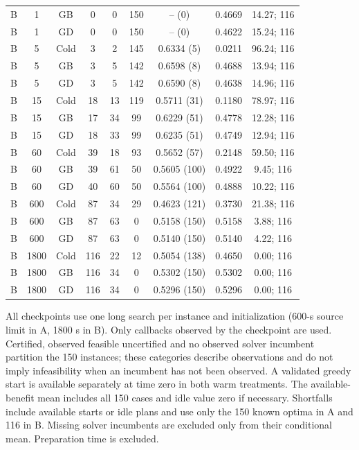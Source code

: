 \begin{table}[!htbp]
\begin{tabular}{@{}ccccccccc@{}}
B & 1 & GB & 0 & 0 & 150 & -- (0) & 0.4669 & 14.27; 116 \\
B & 1 & GD & 0 & 0 & 150 & -- (0) & 0.4622 & 15.24; 116 \\
B & 5 & Cold & 3 & 2 & 145 & 0.6334 (5) & 0.0211 & 96.24; 116 \\
B & 5 & GB & 3 & 5 & 142 & 0.6598 (8) & 0.4688 & 13.94; 116 \\
B & 5 & GD & 3 & 5 & 142 & 0.6590 (8) & 0.4638 & 14.96; 116 \\
B & 15 & Cold & 18 & 13 & 119 & 0.5711 (31) & 0.1180 & 78.97; 116 \\
B & 15 & GB & 17 & 34 & 99 & 0.6229 (51) & 0.4778 & 12.28; 116 \\
B & 15 & GD & 18 & 33 & 99 & 0.6235 (51) & 0.4749 & 12.94; 116 \\
B & 60 & Cold & 39 & 18 & 93 & 0.5652 (57) & 0.2148 & 59.50; 116 \\
B & 60 & GB & 39 & 61 & 50 & 0.5605 (100) & 0.4922 & 9.45; 116 \\
B & 60 & GD & 40 & 60 & 50 & 0.5564 (100) & 0.4888 & 10.22; 116 \\
B & 600 & Cold & 87 & 34 & 29 & 0.4623 (121) & 0.3730 & 21.38; 116 \\
B & 600 & GB & 87 & 63 & 0 & 0.5158 (150) & 0.5158 & 3.88; 116 \\
B & 600 & GD & 87 & 63 & 0 & 0.5140 (150) & 0.5140 & 4.22; 116 \\
B & 1800 & Cold & 116 & 22 & 12 & 0.5054 (138) & 0.4650 & 0.00; 116 \\
B & 1800 & GB & 116 & 34 & 0 & 0.5302 (150) & 0.5302 & 0.00; 116 \\
B & 1800 & GD & 116 & 34 & 0 & 0.5296 (150) & 0.5296 & 0.00; 116 \\
\bottomrule
\end{tabular}
\begin{minipage}{0.98\textwidth}
\footnotesize
All checkpoints use one long search per instance and initialization (600-s source limit in A, 1800 s in B). Only callbacks observed by the checkpoint are used. Certified, observed feasible uncertified and no observed solver incumbent partition the 150 instances; these categories describe observations and do not imply infeasibility when an incumbent has not been observed. A validated greedy start is available separately at time zero in both warm treatments. The available-benefit mean includes all 150 cases and idle value zero if necessary. Shortfalls include available starts or idle plans and use only the 150 known optima in A and 116 in B. Missing solver incumbents are excluded only from their conditional mean. Preparation time is excluded.
\end{minipage}
\end{table}
